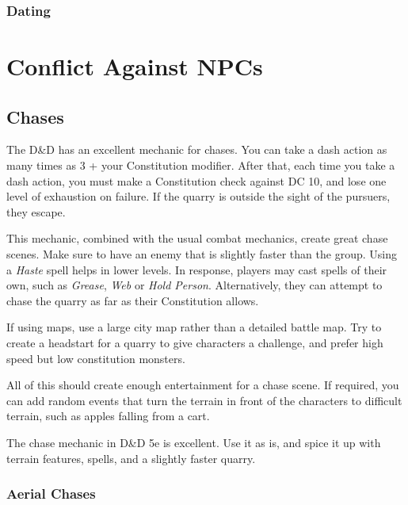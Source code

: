 \documentclass[twocolumn]{dndbook}
\begin{document}
\subsection{Dating}



\chapter{Conflict Against NPCs}
\section{Chases}

The D\&D has an excellent mechanic for chases.
You can take a dash action as many times as 3 + your Constitution modifier.
After that, each time you take a dash action, you must make a Constitution check against DC 10, and lose one level of exhaustion on failure.
If the quarry is outside the sight of the pursuers, they escape.\par

This mechanic, combined with the usual combat mechanics, create great chase scenes.
Make sure to have an enemy that is slightly faster than the group. Using a \emph{Haste} spell helps in lower levels.
In response, players may cast spells of their own, such as \emph{Grease}, \emph{Web} or \emph{Hold Person}.
Alternatively, they can attempt to chase the quarry as far as their Constitution allows.\par

If using maps, use a large city map rather than a detailed battle map.
Try to create a headstart for a quarry to give characters a challenge, and prefer high speed but low constitution monsters.\par

All of this should create enough entertainment for a chase scene.
If required, you can add random events that turn the terrain in front of the characters to difficult terrain, such as apples falling from a cart.\par
\begin{emphasisParagraph}
	The chase mechanic in D\&D 5e is excellent.
	Use it as is, and spice it up with terrain features, spells, and a slightly faster quarry.
\end{emphasisParagraph}

\subsection{Aerial Chases}
\end{document}
